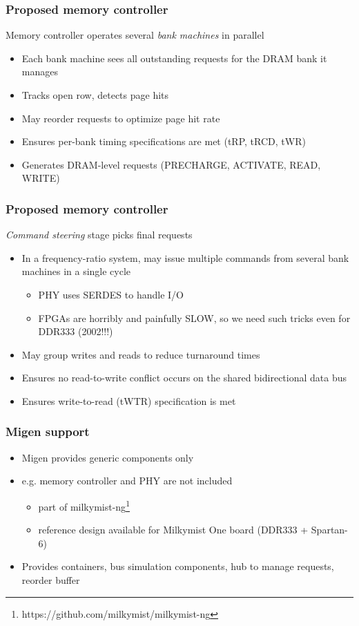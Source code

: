 \documentclass[serif,mathserif]{beamer}
\begin{document}
\begin{frame}
\frametitle{Proposed memory controller}
Memory controller operates several \textit{bank machines} in parallel
\begin{itemize}
\item Each bank machine sees all outstanding requests for the DRAM bank it manages
\item Tracks open row, detects page hits
\item May reorder requests to optimize page hit rate
\item Ensures per-bank timing specifications are met (tRP, tRCD, tWR)
\item Generates DRAM-level requests (PRECHARGE, ACTIVATE, READ, WRITE)
\end{itemize}
\end{frame}

\begin{frame}
\frametitle{Proposed memory controller}
\textit{Command steering} stage picks final requests
\begin{itemize}
\item In a frequency-ratio system, may issue multiple commands from several bank machines in a single cycle
\begin{itemize}
\item PHY uses SERDES to handle I/O
\item FPGAs are horribly and painfully SLOW, so we need such tricks even for DDR333 (2002!!!)
\end{itemize}
\item May group writes and reads to reduce turnaround times
\item Ensures no read-to-write conflict occurs on the shared bidirectional data bus
\item Ensures write-to-read (tWTR) specification is met
\end{itemize}
\end{frame}
\fi

\begin{frame}
\frametitle{Migen support}
\begin{itemize}
\item Migen provides generic components only
\item e.g. memory controller and PHY are not included
\begin{itemize}
\item part of milkymist-ng\footnote{https://github.com/milkymist/milkymist-ng}
\item reference design available for Milkymist One board (DDR333 + Spartan-6)
\end{itemize}
\item Provides containers, bus simulation components, hub to manage requests, reorder buffer
\end{itemize}
\end{frame}
\end{document}
